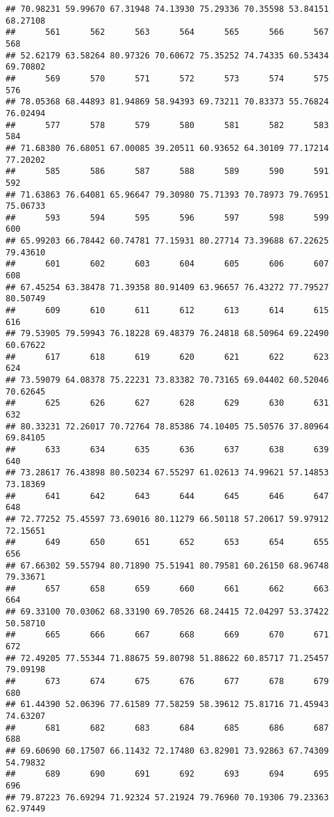 \documentclass[
]{article}
\begin{document}
\begin{verbatim}
## 70.98231 59.99670 67.31948 74.13930 75.29336 70.35598 53.84151 68.27108 
##      561      562      563      564      565      566      567      568 
## 52.62179 63.58264 80.97326 70.60672 75.35252 74.74335 60.53434 69.70802 
##      569      570      571      572      573      574      575      576 
## 78.05368 68.44893 81.94869 58.94393 69.73211 70.83373 55.76824 76.02494 
##      577      578      579      580      581      582      583      584 
## 71.68380 76.68051 67.00085 39.20511 60.93652 64.30109 77.17214 77.20202 
##      585      586      587      588      589      590      591      592 
## 71.63863 76.64081 65.96647 79.30980 75.71393 70.78973 79.76951 75.06733 
##      593      594      595      596      597      598      599      600 
## 65.99203 66.78442 60.74781 77.15931 80.27714 73.39688 67.22625 79.43610 
##      601      602      603      604      605      606      607      608 
## 67.45254 63.38478 71.39358 80.91409 63.96657 76.43272 77.79527 80.50749 
##      609      610      611      612      613      614      615      616 
## 79.53905 79.59943 76.18228 69.48379 76.24818 68.50964 69.22490 60.67622 
##      617      618      619      620      621      622      623      624 
## 73.59079 64.08378 75.22231 73.83382 70.73165 69.04402 60.52046 70.62645 
##      625      626      627      628      629      630      631      632 
## 80.33231 72.26017 70.72764 78.85386 74.10405 75.50576 37.80964 69.84105 
##      633      634      635      636      637      638      639      640 
## 73.28617 76.43898 80.50234 67.55297 61.02613 74.99621 57.14853 73.18369 
##      641      642      643      644      645      646      647      648 
## 72.77252 75.45597 73.69016 80.11279 66.50118 57.20617 59.97912 72.15651 
##      649      650      651      652      653      654      655      656 
## 67.66302 59.55794 80.71890 75.51941 80.79581 60.26150 68.96748 79.33671 
##      657      658      659      660      661      662      663      664 
## 69.33100 70.03062 68.33190 69.70526 68.24415 72.04297 53.37422 50.58710 
##      665      666      667      668      669      670      671      672 
## 72.49205 77.55344 71.88675 59.80798 51.88622 60.85717 71.25457 79.09198 
##      673      674      675      676      677      678      679      680 
## 61.44390 52.06396 77.61589 77.58259 58.39612 75.81716 71.45943 74.63207 
##      681      682      683      684      685      686      687      688 
## 69.60690 60.17507 66.11432 72.17480 63.82901 73.92863 67.74309 54.79832 
##      689      690      691      692      693      694      695      696 
## 79.87223 76.69294 71.92324 57.21924 79.76960 70.19306 79.23363 62.97449 

\end{verbatim}
\end{document}

